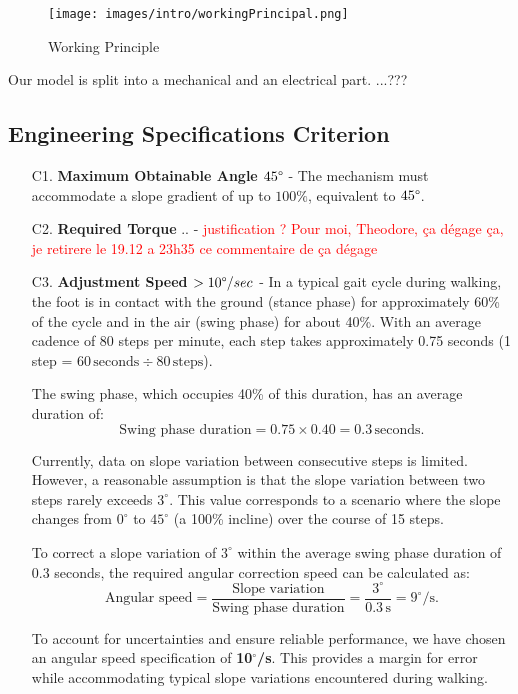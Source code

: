 \documentclass[lettersize,journal]{IEEEtran}
\begin{document}
\begin{figure}[ht]
\centering
\texttt{[image: images/intro/workingPrincipal.png]}
\caption{Working Principle}
\label{pitchhopper}
\end{figure}

Our model is split into a mechanical and an electrical part. ...???

\subsection{Engineering Specifications Criterion}
\begin{enumerate}
    \item[C1.] \textbf{Maximum Obtainable Angle $45\degree$} - The mechanism must accommodate a slope gradient of up to $100\%$, equivalent to $45\degree$.

    \item[C2.] \textbf{Required Torque} .. - \textcolor{red}{justification ? Pour moi, Theodore, ça dégage ça, je retirere le 19.12 a 23h35 ce commentaire de ça dégage}

    \item[C3.] \textbf{Adjustment Speed $>10\degree/sec$} - In a typical gait cycle during walking, the foot is in contact with the ground (stance phase) for approximately 60\% of the cycle and in the air (swing phase) for about 40\%. With an average cadence of 80 steps per minute, each step takes approximately 0.75 seconds (1 step = $60 \, \text{seconds} \div 80 \, \text{steps}$).

The swing phase, which occupies 40\% of this duration, has an average duration of:
\[
\text{Swing phase duration} = 0.75 \times 0.40 = 0.3 \, \text{seconds}.
\]

Currently, data on slope variation between consecutive steps is limited. However, a reasonable assumption is that the slope variation between two steps rarely exceeds $3^\circ$. This value corresponds to a scenario where the slope changes from $0^\circ$ to $45^\circ$ (a 100\% incline) over the course of 15 steps.

To correct a slope variation of $3^\circ$ within the average swing phase duration of 0.3 seconds, the required angular correction speed can be calculated as:
\[
\text{Angular speed} = \frac{\text{Slope variation}}{\text{Swing phase duration}} = \frac{3^\circ}{0.3 \, \text{s}} = 9^\circ/\text{s}.
\]

To account for uncertainties and ensure reliable performance, we have chosen an angular speed specification of \textbf{10$^\circ$/s}. This provides a margin for error while accommodating typical slope variations encountered during walking.



\end{enumerate}
\end{document}
